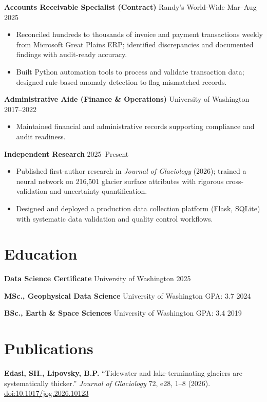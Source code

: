 \documentclass[11pt,a4paper]{article}
\begin{document}
\vspace{0.2cm}
\noindent
\textbf{Accounts Receivable Specialist (Contract)} \hfill Randy's World-Wide \hfill Mar--Aug 2025
\begin{itemize}
    \item Reconciled hundreds to thousands of invoice and payment transactions weekly from Microsoft Great Plains ERP; identified discrepancies and documented findings with audit-ready accuracy.
    \item Built Python automation tools to process and validate transaction data; designed rule-based anomaly detection to flag mismatched records.
\end{itemize}

\vspace{0.2cm}
\noindent
\textbf{Administrative Aide (Finance \& Operations)} \hfill University of Washington \hfill 2017--2022
\begin{itemize}
    \item Maintained financial and administrative records supporting compliance and audit readiness.
\end{itemize}

\vspace{0.2cm}
\noindent
\textbf{Independent Research} \hfill 2025--Present
\begin{itemize}
    \item Published first-author research in \textit{Journal of Glaciology} (2026); trained a neural network on 216,501 glacier surface attributes with rigorous cross-validation and uncertainty quantification.
    \item Designed and deployed a production data collection platform (Flask, SQLite) with systematic data validation and quality control workflows.
\end{itemize}

\section*{Education}

\noindent
\textbf{Data Science Certificate} \hfill University of Washington \hfill 2025

\vspace{0.1cm}
\noindent
\textbf{MSc., Geophysical Data Science} \hfill University of Washington \hfill GPA: 3.7 \hfill 2024

\vspace{0.1cm}
\noindent
\textbf{BSc., Earth \& Space Sciences} \hfill University of Washington \hfill GPA: 3.4 \hfill 2019

\section*{Publications}

\noindent
\textbf{Edasi, SH., Lipovsky, B.P.} ``Tidewater and lake-terminating glaciers are systematically thicker.'' \textit{Journal of Glaciology} 72, e28, 1--8 (2026). \href{https://doi.org/10.1017/jog.2026.10123}{doi:10.1017/jog.2026.10123}
\end{document}
